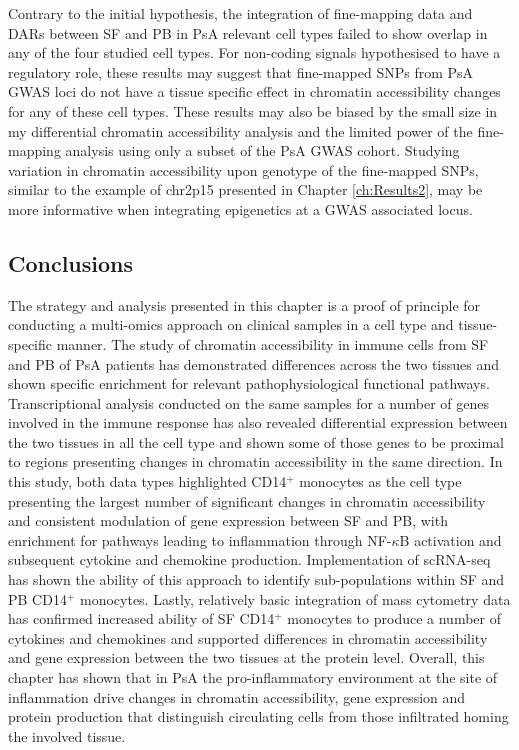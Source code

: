 Contrary to the initial hypothesis, the integration of fine-mapping data and DARs between SF and PB in PsA relevant cell types failed to show overlap in any of the four studied cell types. %
For non-coding signals hypothesised to have a regulatory role, these results may suggest that fine-mapped SNPs from PsA GWAS loci do not have a tissue specific effect in chromatin accessibility changes for any of these cell types. These results may also be biased by the small size in my differential chromatin accessibility analysis and the limited power of the fine-mapping analysis using only a subset of the PsA GWAS cohort. Studying variation in chromatin accessibility upon genotype of the fine-mapped SNPs, similar to the example of chr2p15 presented in Chapter \ref{ch:Results2}, may be more informative when integrating epigenetics at a GWAS associated locus.


\subsection{Conclusions}
The strategy and analysis presented in this chapter is a proof of principle for conducting a multi-omics approach on clinical samples in a cell type and tissue-specific manner. The study of chromatin accessibility in immune cells from SF and PB of PsA patients has demonstrated differences across the two tissues and shown specific enrichment for relevant pathophysiological functional pathways. Transcriptional analysis conducted on the same samples for a number of genes involved in the immune response has also revealed differential expression between the two tissues in all the cell type and shown some of those genes to be proximal to regions presenting changes in chromatin accessibility in the same direction. In this study, both data types highlighted CD14$^+$ monocytes as the cell type presenting the largest number of significant changes in chromatin accessibility and consistent modulation of gene expression between SF and PB, with enrichment for pathways leading to inflammation through NF-$\kappa$B activation and subsequent cytokine and chemokine production. Implementation of scRNA-seq has shown the ability of this approach to identify sub-populations within SF and PB CD14$^+$ monocytes. Lastly, relatively basic integration of mass cytometry data has confirmed increased ability of SF CD14$^+$ monocytes to produce a number of cytokines and chemokines and supported differences in chromatin accessibility and gene expression between the two tissues at the protein level. Overall, this chapter has shown that in PsA the pro-inflammatory environment at the site of inflammation drive changes in chromatin accessibility, gene expression and protein production that distinguish circulating cells from those infiltrated homing the involved tissue.




